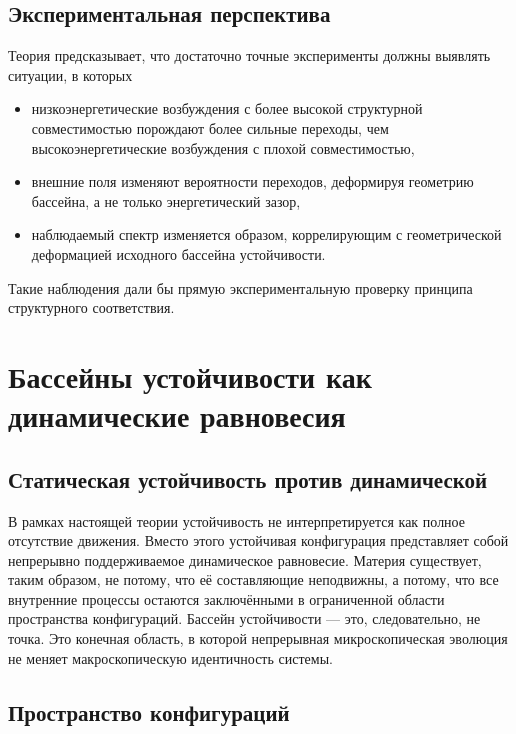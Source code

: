 \section{Экспериментальная перспектива}

Теория предсказывает, что достаточно точные эксперименты должны выявлять ситуации, в которых

\begin{itemize}

\item низкоэнергетические возбуждения с более высокой структурной совместимостью
порождают более сильные переходы, чем высокоэнергетические возбуждения
с плохой совместимостью,

\item внешние поля изменяют вероятности переходов,
деформируя геометрию бассейна, а не только энергетический зазор,

\item наблюдаемый спектр изменяется образом,
коррелирующим с геометрической деформацией
исходного бассейна устойчивости.

\end{itemize}

Такие наблюдения дали бы прямую экспериментальную проверку принципа структурного соответствия.

\chapter{Бассейны устойчивости как динамические равновесия}

\section{Статическая устойчивость против динамической}

В рамках настоящей теории устойчивость не интерпретируется как полное отсутствие движения. Вместо этого устойчивая конфигурация представляет собой непрерывно поддерживаемое динамическое равновесие. Материя существует, таким образом, не потому, что её составляющие неподвижны, а потому, что все внутренние процессы остаются заключёнными в ограниченной области пространства конфигураций. Бассейн устойчивости — это, следовательно, не точка. Это конечная область, в которой непрерывная микроскопическая эволюция не меняет макроскопическую идентичность системы.

\section{Пространство конфигураций}

